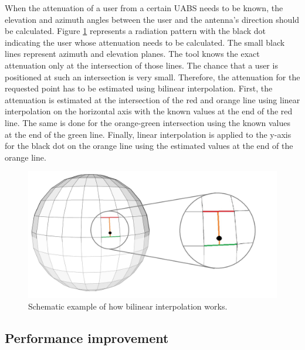 When the attenuation of a user from a certain \gls{UABS} needs to be known, the elevation and azimuth angles between the user and the antenna's direction 
should be calculated. 
Figure \ref{fig:globe} represents a radiation pattern with the black dot indicating the user whose attenuation needs to be calculated.
The small black lines represent azimuth and elevation planes. 
The tool knows the exact attenuation only at the intersection of those lines. 
The chance that a user is positioned at such an intersection is very small. Therefore, the attenuation for the requested point has to be estimated using bilinear interpolation.
First, the attenuation is estimated at the intersection of the red and orange line using linear interpolation on the horizontal axis with the known values at the end of the red line. 
The same is done for the orange-green intersection using the known values at the end of the green line. Finally, linear interpolation
is applied to the y-axis for the black dot on the orange line using the estimated values at the end of the orange line.

\begin{figure}[H]
\centering
  \includegraphics[width=\textwidth/3*2]{../images/3Dimages/globev2.jpg}
  \caption{Schematic example of how bilinear interpolation works.}
  \label{fig:globe}
\end{figure}

\subsection{Performance improvement}
